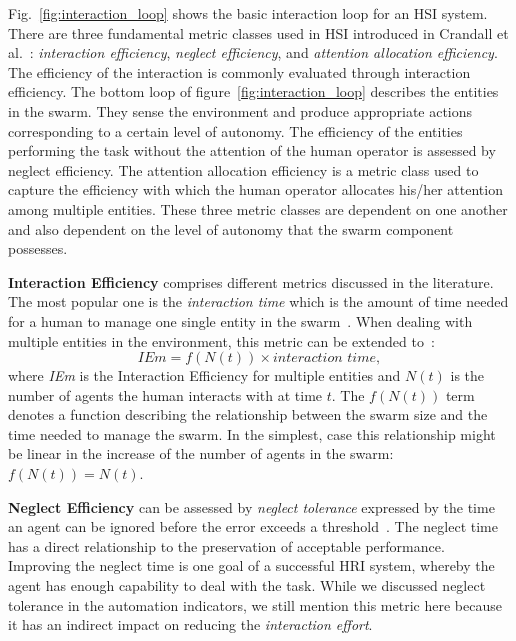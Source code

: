 \documentclass[journal]{IEEEtran}
\begin{document}
Fig.~\ref{fig:interaction_loop} shows the basic interaction loop for an HSI system.  There are three fundamental metric classes used in HSI introduced in Crandall et al.~\cite{crandall2007identifying}: \textit{interaction efficiency}, \textit{neglect efficiency}, and \textit{attention allocation efficiency}. The efficiency of the interaction is commonly evaluated through interaction efficiency. The bottom loop of figure~\ref{fig:interaction_loop}  describes the entities in the swarm. They sense the environment and produce appropriate actions corresponding to a certain level of autonomy. The efficiency of the entities performing the task without the attention of the human operator is assessed by neglect efficiency. The attention allocation efficiency is a metric class used to capture the efficiency with which the human operator allocates his/her attention among multiple entities. These three metric classes are dependent on one another and also dependent on the level of autonomy that the swarm component possesses.

\textbf{Interaction Efficiency} comprises different metrics discussed in the literature. The most popular one is the \textit{interaction time} which is the amount of time needed for a human to manage one single entity in the swarm~\cite{crandall2005validating}. When dealing with multiple entities in the environment, this metric can be extended to~\cite{kerman2013methods}:
\begin{equation}
    \textit{IEm} = f(N(t))\times \textit{interaction\ \ time},
\end{equation}
where \textit{IEm} is the Interaction Efficiency for multiple entities and $N(t)$ is the number of agents the human interacts with at time $t$. The $f(N(t))$ term denotes a function describing the relationship between the swarm size and the time needed to manage the swarm. In the simplest, case this relationship might be linear in the increase of the number of agents in the swarm: $f(N(t)) = N(t)$.

\textbf{Neglect Efficiency} can be assessed by \textit{neglect tolerance} expressed by the time an agent can be ignored before the error exceeds a threshold~\cite{goodrich2003seven}. The neglect time has a direct relationship to the preservation of acceptable performance. Improving the neglect time is one goal of a successful HRI system, whereby the agent has enough capability to deal with the task. While we discussed neglect tolerance in the automation indicators, we still mention this metric here because it has an indirect impact on reducing the \textit{interaction effort}.
\end{document}
